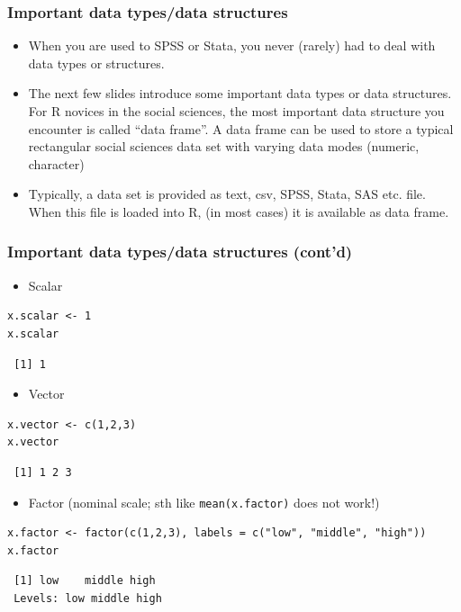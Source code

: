 \documentclass[bigger]{beamer}
\begin{document}
\begin{frame}
\frametitle{Important data types/data structures}
\label{sec-1-2-8}

\begin{itemize}
\item When you are used to SPSS or Stata, you never (rarely) had to deal with
      data types or structures.
\item The next few slides introduce some important data types or data
      structures. For R novices in the social sciences, the most important data
      structure you encounter is called \enquote{data frame}. A data frame can
      be used to store a typical rectangular social sciences data set with
      varying data modes (numeric, character)
\item Typically, a data set is provided as text, csv, SPSS, Stata, SAS
      etc. file. When this file is loaded into R, (in most cases) it is available as data
      frame.
\end{itemize}
\end{frame}
\begin{frame}[fragile,shrink = 15]
\frametitle{Important data types/data structures (cont'd)}
\label{sec-1-2-9}

\begin{itemize}
\item Scalar
\end{itemize}

\lstset{language=R}
\begin{lstlisting}
x.scalar <- 1
x.scalar
\end{lstlisting}

\begin{verbatim}
 [1] 1
\end{verbatim}


\begin{itemize}
\item Vector
\end{itemize}

\lstset{language=R}
\begin{lstlisting}
x.vector <- c(1,2,3)
x.vector
\end{lstlisting}

\begin{verbatim}
 [1] 1 2 3
\end{verbatim}

\begin{itemize}
\item Factor (nominal scale; sth like \texttt{mean(x.factor)} does not work!)
\end{itemize}

\lstset{language=R}
\begin{lstlisting}
x.factor <- factor(c(1,2,3), labels = c("low", "middle", "high"))
x.factor
\end{lstlisting}

\begin{verbatim}
 [1] low    middle high  
 Levels: low middle high
\end{verbatim}


\end{frame}
\end{document}
